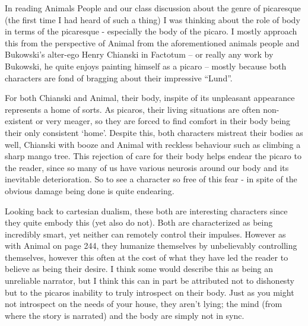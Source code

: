 


In reading Animals People and our class discussion about the genre of picaresque (the first time I had heard of such a thing) I was thinking about the role of body in terms of the picaresque - especially the body of the picaro. I mostly approach this from the perspective of Animal from the aforementioned animals people and Bukowski's alter-ego Henry Chianski in Factotum -- or really any work by Bukowski, he quite enjoys painting himself as a picaro -- mostly because both characters are fond of bragging about their impressive ``Lund''. 

For both Chianski and Animal, their body, inspite of its unpleasant appearance represents a home of sorts. As picaros, their living situations are often non-existent or very meager, so they are forced to find comfort in their body being their only consistent `home'. Despite this, both characters mistreat their bodies as well, Chianski with booze and Animal with reckless behaviour such as climbing a sharp mango tree. This rejection of care for their body helps endear the picaro to the reader, since so many of us have various neurosis around our body and its inevitable deterioration. So to see a character so free of this fear - in spite of the obvious damage being done is quite endearing. 

Looking back to cartesian dualism, these both are interesting characters since they quite embody this (yet also do not). Both are characterized as being incredibly smart, yet neither can remotely control their impulses. However as with Animal on page 244, they humanize themselves by unbelievably controlling themselves, however this often at the cost of what they have led the reader to believe as being their desire. I think some would describe this as being an unreliable narrator, but I think this can in part be attributed not to dishonesty but to the picaros inability to truly introspect on their body. Just as you might not introspect on the needs of your house, they aren't lying; the mind (from where the story is narrated) and the body are simply not in sync. 

